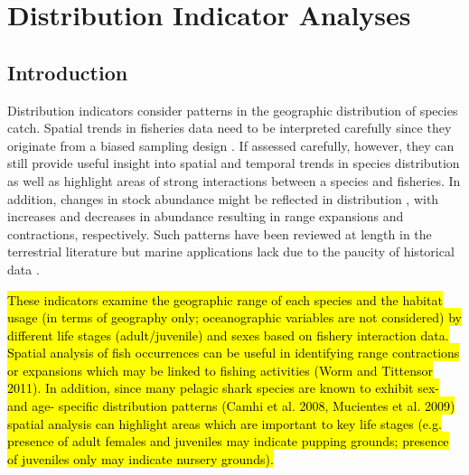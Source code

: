 \documentclass[12pt]{SCreport}
\begin{document}
        
             
        
\section{Distribution Indicator Analyses}
      \subsection{Introduction}

      Distribution indicators consider patterns in the geographic distribution of species catch. Spatial trends in fisheries data need to be interpreted carefully since they originate from a biased sampling design \citep{Walters2003_a}. If assessed carefully, however, they can still provide useful insight into spatial and temporal trends in species distribution as well as highlight areas of strong interactions between a species and fisheries. In addition, changes in stock abundance might be reflected in distribution \citep{MacCall1990}, with increases and decreases in abundance resulting in range expansions and contractions, respectively. Such patterns have been reviewed at length in the terrestrial literature \citep{Borregaard2010_a} but marine applications lack due to the paucity of historical data \citep[but see][]{Worm2011_a}. 
      
\hl{These indicators examine the geographic range of each species and the habitat usage (in terms of geography only; oceanographic variables are not considered) by different life stages (adult/juvenile) and sexes based on fishery interaction data. Spatial analysis of fish occurrences can be useful in identifying range contractions or expansions which may be linked to fishing activities (Worm and Tittensor 2011). In addition, since many pelagic shark species are known to exhibit sex- and age- specific distribution patterns (Camhi et al. 2008, Mucientes et al. 2009) spatial analysis can highlight areas which are important to key life stages (e.g. presence of adult females and juveniles may indicate pupping grounds; presence of juveniles only may indicate nursery grounds).}
      
\end{document}
